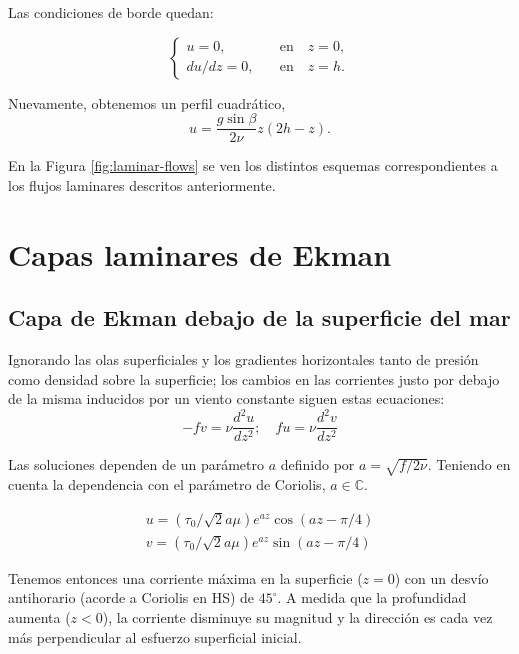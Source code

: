 \documentclass[openany]{book}
\begin{document}
\par Las condiciones de borde quedan:

\begin{equation}
    \begin{cases}
        u=0,&\quad \mathrm{en}\quad z=0,\\
        du/dz=0,&\quad \mathrm{en}\quad z=h.
    \end{cases}
\end{equation}

\par Nuevamente, obtenemos un perfil cuadrático,
\begin{equation}
    u=\frac{g\sin\beta}{2\nu}z(2h-z).
\end{equation}

En la Figura \ref{fig:laminar-flows} se ven los distintos esquemas
correspondientes a los flujos laminares descritos anteriormente.

\section{Capas laminares de Ekman}

\subsection{Capa de Ekman debajo de la superficie del mar}
Ignorando las olas superficiales y los gradientes horizontales tanto
de presión como densidad sobre la superficie; los cambios en las
corrientes justo por debajo de la misma inducidos por un viento
constante siguen estas ecuaciones:
\begin{equation}
    -fv=\nu \frac{d^2u}{dz^2};\quad fu=\nu \frac{d^2v}{dz^2}
\end{equation}

\par Las soluciones dependen de un parámetro $a$ definido por
$a=\sqrt{f/2\nu}$. Teniendo en cuenta la dependencia con el parámetro
de Coriolis, $a\in\mathbb{C}$.

\begin{gather}
    u=(\tau_0/\sqrt{2}a\mu)e^{az}\cos{(az-\pi/4)}\\
    v=(\tau_0/\sqrt{2}a\mu)e^{az}\sin{(az-\pi/4)}
\end{gather}

\par Tenemos entonces una corriente máxima en la superficie ($z=0$)
con un desvío antihorario (acorde a Coriolis en HS) de $45^\circ$. A
medida que la profundidad aumenta ($z<0$), la corriente disminuye su
magnitud y la dirección es cada vez más perpendicular al esfuerzo
superficial inicial.
\end{document}
